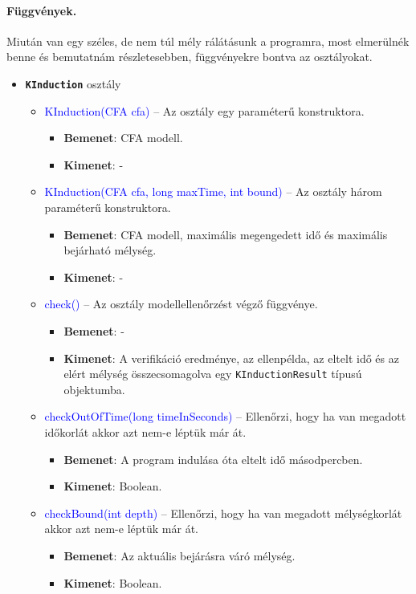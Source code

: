 \paragraph{Függvények.}
Miután van egy széles, de nem túl mély rálátásunk a programra, most elmerülnék benne és bemutatnám részletesebben, függvényekre bontva az osztályokat.
\begin{itemize}
	\item \textbf{\texttt{KInduction}} osztály
	\begin{itemize}
		\item \textcolor{blue}{KInduction(CFA cfa)} -- Az osztály egy paraméterű konstruktora.
		\begin{itemize}
			\item \textbf{Bemenet}: CFA modell.
			\item \textbf{Kimenet}: -
		\end{itemize}
	
		\item \textcolor{blue}{KInduction(CFA cfa, long maxTime, int bound)} -- Az osztály három paraméterű konstruktora.
		\begin{itemize}
			\item \textbf{Bemenet}: CFA modell, maximális megengedett idő és maximális bejárható mélység.
			\item \textbf{Kimenet}: -
		\end{itemize}
	
		\item \textcolor{blue}{check()} -- Az osztály modellellenőrzést végző függvénye.
		\begin{itemize}
			\item \textbf{Bemenet}: -
			\item \textbf{Kimenet}: A verifikáció eredménye, az ellenpélda, az eltelt idő és az elért mélység összecsomagolva egy \texttt{KInductionResult} típusú objektumba.
		\end{itemize}
	
		\item \textcolor{blue}{checkOutOfTime(long timeInSeconds)} -- Ellenőrzi, hogy ha van megadott időkorlát akkor azt nem-e léptük már át.
		\begin{itemize}
			\item \textbf{Bemenet}: A program indulása óta eltelt idő másodpercben.
			\item \textbf{Kimenet}: Boolean.
		\end{itemize}
	
	
		\item \textcolor{blue}{checkBound(int depth)} -- Ellenőrzi, hogy ha van megadott mélységkorlát akkor azt nem-e léptük már át.
		\begin{itemize}
			\item \textbf{Bemenet}: Az aktuális bejárásra váró mélység.
			\item \textbf{Kimenet}: Boolean.
		\end{itemize}
	

\end{itemize}
\end{itemize}
